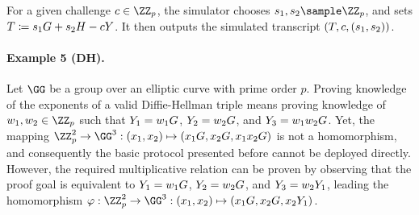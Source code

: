 \documentclass[runningheads]{llncs}
\begin{document}
For a given challenge $c\in\ZZ_p$, the simulator chooses $s_1,s_2\sample\ZZ_p$, and sets $T\coloneqq s_1G + s_2H -cY$.
It then outputs the simulated transcript $(T,c,(s_1,s_2))$.

\paragraph{Example 5 (DH).}
Let $\GG$ be a group over an elliptic curve with prime order $p$.
Proving knowledge of the exponents of a valid Diffie-Hellman triple means proving knowledge of $w_1,w_2\in\ZZ_p$ such that $Y_1=w_1G$, $Y_2=w_2G$, and $Y_3=w_1 w_2 G$.
Yet, the mapping $\ZZ_p^2\to\GG^3:(x_1,x_2)\mapsto (x_1G,x_2G,x_1x_2G)$ is not a homomorphism, and consequently the basic protocol presented before cannot be deployed directly.
However, the required multiplicative relation can be proven by observing that the proof goal is equivalent to $Y_1=w_1G$, $Y_2=w_2G$, and $Y_3=w_2Y_1$, leading the homomorphism $\varphi:\ZZ_p^2\to\GG^3:(x_1,x_2)\mapsto(x_1G,x_2G,x_2\statement_1)$.
\end{document}
